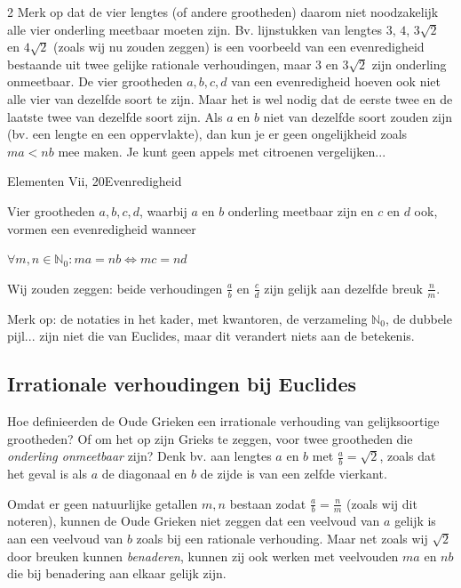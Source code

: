 \begin{multicols}{2}
	Merk op dat de vier lengtes (of andere grootheden) daarom niet noodzakelijk alle vier onderling meetbaar moeten zijn. Bv. lijnstukken van lengtes $3$, $4$, $3\sqrt{2}$ en $4\sqrt{2}$ (zoals wij nu zouden zeggen) is een voorbeeld van een evenredigheid bestaande uit twee gelijke rationale verhoudingen, maar $3$ en $3\sqrt{2}$ zijn onderling onmeetbaar. De vier grootheden $a, b, c, d$ van een evenredigheid hoeven ook niet alle vier van dezelfde soort te zijn. Maar het is wel nodig dat de eerste twee en de laatste twee van dezelfde soort zijn. Als $a$ en $b$ niet van dezelfde soort zouden zijn (bv. een lengte en een oppervlakte), dan kun je er geen ongelijkheid zoals $ma<nb$ mee maken. Je kunt geen appels met citroenen vergelijken...
	
	\begin{kader}{Elementen Vii, 20}{Evenredigheid}
		
		Vier grootheden $a, b, c, d$, waarbij $a$ en $b$ onderling meetbaar zijn en $c$ en $d$ ook, vormen een evenredigheid wanneer
		
		$\forall m, n \in \mathbb{N}_0: ma=nb \Leftrightarrow mc=nd$
		
	\end{kader}
	
	Wij zouden zeggen: beide verhoudingen $\frac{a}{b}$ en $\frac{c}{d}$ zijn gelijk aan dezelfde breuk $\frac{n}{m}$.
	
	Merk op: de notaties in het kader, met kwantoren, de verzameling $\mathbb{N}_0$, de dubbele pijl... zijn niet die van Euclides, maar dit verandert niets aan de betekenis.
	
	\subsection*{Irrationale verhoudingen bij Euclides}
	
	Hoe definieerden de Oude Grieken een irrationale verhouding van gelijksoortige grootheden? Of om het op zijn Grieks te zeggen, voor twee grootheden die \emph{onderling onmeetbaar} zijn? Denk bv. aan lengtes $a$ en $b$ met $\frac{a}{b}=\sqrt{2}$, zoals dat het geval is als $a$  de diagonaal en $b$ de zijde is van een zelfde vierkant.
	
	Omdat er geen natuurlijke getallen $m, n$ bestaan zodat $\frac{a}{b}=\frac{n}{m}$ (zoals wij dit noteren), kunnen de Oude Grieken niet zeggen dat een veelvoud van $a$ gelijk is aan een veelvoud van $b$ zoals bij een rationale verhouding. Maar net zoals wij $\sqrt{2}$ door breuken kunnen \emph{benaderen}, kunnen zij ook werken met veelvouden $ma$ en $nb$ die bij benadering aan elkaar gelijk zijn. 
	

\end{multicols}
